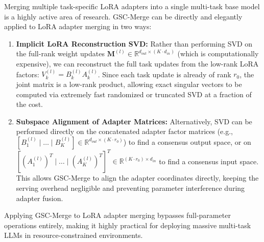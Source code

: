 Merging multiple task-specific LoRA adapters into a single multi-task base model is a highly active area of research. GSC-Merge can be directly and elegantly applied to LoRA adapter merging in two ways:
\begin{enumerate}
    \item \textbf{Implicit LoRA Reconstruction SVD:} Rather than performing SVD on the full-rank weight updates $\mathbf{M}^{(l)} \in \mathbb{R}^{d_{out} \times (K \cdot d_{in})}$ (which is computationally expensive), we can reconstruct the full task updates from the low-rank LoRA factors: $V_k^{(l)} = B_k^{(l)} A_k^{(l)}$. Since each task update is already of rank $r_0$, the joint matrix is a low-rank product, allowing exact singular vectors to be computed via extremely fast randomized or truncated SVD at a fraction of the cost.
    \item \textbf{Subspace Alignment of Adapter Matrices:} Alternatively, SVD can be performed directly on the concatenated adapter factor matrices (e.g., $[B_1^{(l)} \mid \dots \mid B_K^{(l)}] \in \mathbb{R}^{d_{out} \times (K \cdot r_0)}$) to find a consensus output space, or on $[(A_1^{(l)})^T \mid \dots \mid (A_K^{(l)})^T]^T \in \mathbb{R}^{(K \cdot r_0) \times d_{in}}$ to find a consensus input space. This allows GSC-Merge to align the adapter coordinates directly, keeping the serving overhead negligible and preventing parameter interference during adapter fusion.
\end{enumerate}
Applying GSC-Merge to LoRA adapter merging bypasses full-parameter operations entirely, making it highly practical for deploying massive multi-task LLMs in resource-constrained environments.
